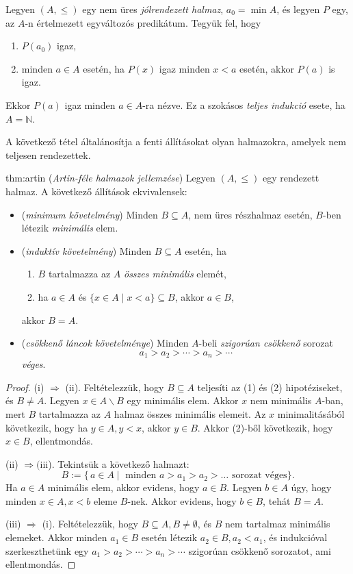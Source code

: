 \begin{rem}
Legyen $(A,\leq)$ egy nem üres \emph{jólrendezett halmaz}, $a_{0}=\min A$,
és legyen $P$ egy, az $A$-n értelmezett egyváltozós predikátum.
Tegyük fel, hogy \begin{enumerate}

\item $P(a_{0})$ igaz,

\item minden $a\in A$ esetén, ha $P(x)$ igaz minden $x<a$ esetén,
akkor $P(a)$ is igaz. \end{enumerate} Ekkor $P(a)$ igaz minden
$a\in A$-ra nézve. Ez a szokásos \emph{teljes indukció} esete, ha
$A=\mathbb{N}$. 
\end{rem}

A következő tétel általánosítja a fenti állításokat olyan halmazokra,
amelyek nem teljesen rendezettek.
\begin{theorem}{thm:artin} (\emph{Artin-féle halmazok jellemzése}) Legyen
$(A,\leq)$ egy rendezett halmaz. A következő állítások ekvivalensek: 
\begin{itemize}
\item[(i)] (\emph{minimum követelmény}) Minden $B\subseteq A$, nem üres részhalmaz
esetén, $B$-ben létezik \emph{minimális} elem. 
\item[(ii)] (\emph{induktív követelmény}) Minden $B\subseteq A$ esetén, ha 
\begin{enumerate}
\item $B$ tartalmazza az $A$ \emph{összes minimális} elemét, 
\item ha $a\in A$ és $\{x\in A\mid x<a\}\subseteq B$, akkor $a\in B$, 
\end{enumerate}
akkor $B=A$. 
\item[(iii)] (\emph{csökkenő láncok követelménye}) Minden $A$-beli \emph{szigorúan
csökkenő} sorozat 
\[
a_{1}>a_{2}>\cdots>a_{n}>\cdots
\]
\emph{véges}. 
\end{itemize}
\end{theorem}
\begin{proof} (i) $\Rightarrow$ (ii). Feltételezzük,
hogy $B\subseteq A$ teljesíti az (1) és (2) hipotéziseket, és $B\neq A$.
Legyen $x\in A\backslash B$ egy minimális elem. Akkor $x$ nem minimális
$A$-ban, mert $B$ tartalmazza az $A$ halmaz összes minimális elemeit.
Az $x$ minimalitásából következik, hogy ha $y\in A,y<x$, akkor $y\in B$.
Akkor (2)-ből következik, hogy $x\in B$, ellentmondás.

\noindent (ii) $\Rightarrow($iii). Tekintsük a következő halmazt:
\[
B:=\{\,a\in A\mid\text{ minden }a>a_{1}>a_{2}>\ldots\text{ sorozat véges}\}.
\]
Ha $a\in A$ minimális elem, akkor evidens, hogy $a\in B$. Legyen
$b\in A$ úgy, hogy minden $x\in A,x<b$ eleme $B$-nek. Akkor evidens,
hogy $b\in B$, tehát $B=A$.

\noindent (iii) $\Rightarrow$ (i). Feltételezzük, hogy $B\subseteq A,B\neq\emptyset$,
és $B$ nem tartalmaz minimális elemeket. Akkor minden $a_{1}\in B$
esetén létezik $a_{2}\in B,a_{2}<a_{1}$, és indukcióval szerkeszthetünk
egy $a_{1}>a_{2}>\cdots>a_{n}>\cdots$ szigorúan csökkenő sorozatot,
ami ellentmondás. 
\end{proof}

